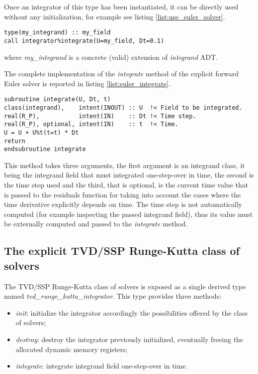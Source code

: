 \documentclass[pdftex,preprint,3p,times,numbers]{elsarticle}
\begin{document}
Once an integrator of this type has been instantiated, it can be directly used without any initialization, for example see listing \ref{list:use_euler_solver}.

\begin{lstlisting}[firstnumber=1,style=code,caption={example of usage of an explicit forward Euler integrator},label={list:use_euler_solver}]
type(my_integrand) :: my_field
call integrator%integrate(U=my_field, Dt=0.1)
\end{lstlisting}
where \emph{my\_integrand} is a concrete (valid) extension of \emph{integrand} ADT.

The complete implementation of the \emph{integrate} method of the explicit forward Euler solver is reported in listing \ref{list:euler_integrate}.

\begin{lstlisting}[firstnumber=1,style=code,caption={implementation of the \emph{integrate} method of Euler solver},label={list:euler_integrate}]
subroutine integrate(U, Dt, t)
class(integrand),    intent(INOUT) :: U  !< Field to be integrated.
real(R_P),           intent(IN)    :: Dt !< Time step.
real(R_P), optional, intent(IN)    :: t  !< Time.
U = U + U%t(t=t) * Dt
return
endsubroutine integrate
\end{lstlisting}
This method takes three arguments, the first argument is an integrand class, it being the integrand field that must integrated one-step-over in time, the second is the time step used and the third, that is optional, is the current time value that is passed to the residuals function for taking into account the cases where the time derivative explicitly depends on time. The time step is not automatically computed (for example inspecting the passed integrand field), thus its value must be externally computed and passed to the \emph{integrate} method.

\subsection{The explicit TVD/SSP Runge-Kutta class of solvers}\label{subsec:solver_tvd_rk}

The TVD/SSP Runge-Kutta class of solvers is exposed as a single derived type named \emph{tvd\_runge\_kutta\_integrator}. This type provides three methods:

\begin{itemize}
  \item \emph{init}: initialize the integrator accordingly the possibilities offered by the class of solvers;
  \item \emph{destroy}: destroy the integrator previously initialized, eventually freeing the allocated dynamic memory registers;
  \item \emph{integrate}: integrate integrand field one-step-over in time.
  \end{itemize}
\end{document}

